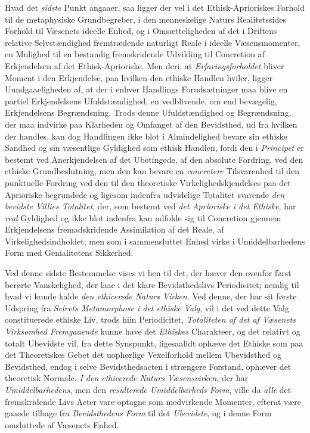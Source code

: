 Hvad det \emph{sidste} Punkt angaaer, saa ligger der vel i det
Ethisk-Aprioriskes Forhold til de metaphysiske Grundbegreber, i den menneskelige
Naturs Realitetssides Forhold til Væsenets ideelle Enhed, og i Omsætteligheden af
det i Driftens relative Selvstændighed fremtrædende naturligt Reale i ideelle
Væsensmomenter, en Mulighed til en bestandig fremskridende Udvikling til
Concretion af Erkjendelsen af det Ethisk-Aprioriske. Men deri, at
\emph{Erfaringsforholdet} bliver Moment i den Erkjendelse, paa hvilken den ethiske
Handlen hviler, ligger Uundgaaeligheden af, at der i enhver Handlings
Forudsætninger maa blive en partiel Erkjendelsens Ufuldstændighed, en vedblivende,
om end bevægelig, Erkjendelsens Begrændsning. Trods denne Ufuldstændighed og
Begrændsning, der maa indvirke paa Klarheden og Omfanget af den Bevidsthed, ud fra
hvilken der handles, kan dog Handlingen ikke blot i Almindelighed bevare sin
ethiske Sandhed og sin væsentlige Gyldighed som ethisk Handlen, fordi den i
\emph{Principet} er bestemt ved Anerkjendelsen af det Ubetingede, af den absolute
Fordring, ved den ethiske Grundbeslutning, men den kan bevare en
\emph{concretere} Tilsvarenhed til den punktuelle Fordring ved den til den
theoretiske Virkelighedskjendelses paa det Aprioriske begrundede og ligesom
indenfra udvidelige Totalitet svarende \emph{den bevidste Villies Totalitet}, der,
som bestemt ved \emph{det Aprioriske i det Ethiske}, har \emph{real} Gyldighed og
ikke blot indenfra kan udfolde sig til Concretion gjennem Erkjendelsens
fremadskridende Assimilation af det Reale, af Virkelighedsindholdet;
 men som i sammensluttet Enhed virke i Umiddelbarhedens Form med Genialitetens
Sikkerhed.

Ved denne sidste Bestemmelse vises vi hen til det, der hæver den ovenfor først
berørte Vanskelighed, der laae i det klare Bevidsthedslivs Periodicitet; nemlig
til hvad vi kunde kalde \emph{den ethicerede Naturs Virken}. Ved denne, der har
sit første Udspring fra \emph{Selvets Metamorphose i det ethiske Valg}, vil i det
ved dette Valg constituerede ethiske Liv, trods hiin Periodicitet,
\emph{Totaliteten af det af Væsenets Virksomhed Fremgaaende} kunne have det
\emph{Ethiskes} Charakteer, og det relativt og totalt Ubevidste vil, fra dette
Synspunkt, ligesaalidt ophæve det Ethiske som paa det Theoretiskes Gebet det
uophørlige Vexelforhold mellem Ubevidsthed og Bevidsthed, endog i selve
Bevidsthedsacten i strængere Forstand, ophæver det theoretisk Normale. \emph{I den
ethicerede Naturs Væsensvirken}, der har \emph{Umiddelbarhedens}, men den
\emph{resulterede Umiddelbarheds Form}, ville da \emph{alle} det fremskridende
Livs Acter vare optagne som medvirkende Momenter, efterat være gaaede tilbage fra
\emph{Bevidsthedens Form} til det \emph{Ubevidste}, og i denne Form omsluttede af
Væsenets Enhed.

